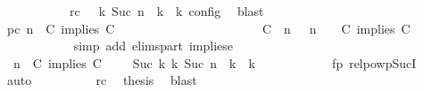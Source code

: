 \begin{isabellebody}
\ \ \ \ \ \ \ \ \ \ \ rc{\isacharcolon}{\isacartoucheopen}{\isasymrho}\ {\isasymin}\ {\isasymlbrakk}\ {\isasymGamma}\isactrlsub k{\isacharcomma}\ Suc\ n\ {\isasymturnstile}\ {\isasymPsi}\isactrlsub k\ {\isasymtriangleright}\ {\isasymPhi}\isactrlsub k\ {\isasymrbrakk}\isactrlsub c\isactrlsub o\isactrlsub n\isactrlsub f\isactrlsub i\isactrlsub g{\isacartoucheclose}\ \isamarkupfalse%
\ blast\isanewline
\ \ \ \ \ \ \ \ \isamarkupfalse%
\ pc{\isacharcolon}{\isacartoucheopen}{\isacharparenleft}{\isasymGamma}{\isacharcomma}\ n\ {\isasymturnstile}\ {\isacharparenleft}C\ implies\ C\ {\isacharhash}\ {\isasymPsi}\ {\isasymtriangleright}\ {\isasymPhi}{\isacharparenright}\isanewline
\ \ \ \ \ \ \ \ \ \ \ \ \ \ \ \ \ \ {\isasymhookrightarrow}\ {\isacharparenleft}{\isacharparenleft}{\isacharparenleft}C\ {\isasymnot}{\isasymUp}\ n{\isacharparenright}\ {\isacharhash}\ {\isasymGamma}{\isacharparenright}{\isacharcomma}\ n\ {\isasymturnstile}\ {\isasymPsi}\ {\isasymtriangleright}\ {\isacharparenleft}{\isacharparenleft}C\ implies\ C\ {\isacharhash}\ {\isasymPhi}{\isacharparenright}{\isacharparenright}{\isacartoucheclose}\isanewline
\ \ \ \ \ \ \ \ \ \ \isamarkupfalse%
\ {\isacharparenleft}simp\ add{\isacharcolon}\ elims{\isacharunderscore}part\ implies{\isacharunderscore}e{}{\isacharparenright}\isanewline
\ \ \ \ \ \ \ \ \isamarkupfalse%
\ {\isacartoucheopen}{\isacharparenleft}{\isasymGamma}{\isacharcomma}\ n\ {\isasymturnstile}\ {\isacharparenleft}C\ implies\ C\ {\isacharhash}\ {\isasymPsi}\ {\isasymtriangleright}\ {\isasymPhi}{\isacharparenright}\ {\isasymhookrightarrow}\isactrlbsup Suc\ k\isactrlesup \ {\isacharparenleft}{\isasymGamma}\isactrlsub k{\isacharcomma}\ Suc\ n\ {\isasymturnstile}\ {\isasymPsi}\isactrlsub k\ {\isasymtriangleright}\ {\isasymPhi}\isactrlsub k{\isacharparenright}{\isacartoucheclose}\isanewline
\ \ \ \ \ \ \ \ \ \ \isamarkupfalse%
\ fp\ relpowp{\isacharunderscore}Suc{\isacharunderscore}I{}\ \isamarkupfalse%
\ auto\isanewline
\ \ \ \ \ \ \ \ \isamarkupfalse%
\ rc\ \isamarkupfalse%
\ {\isacharquery}thesis\ \isamarkupfalse%
\ blast\isanewline
\ \ \ \ \ \ \isamarkupfalse%
\isanewline
\ \ \ \ \ \ \isamarkupfalse%

\end{isabellebody}
